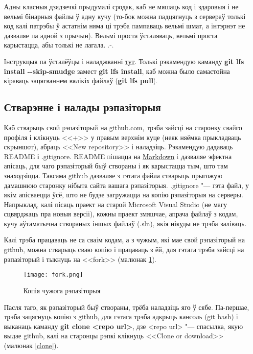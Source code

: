 \documentclass[12pt, a4paper]{extarticle}
\begin{document}
Адны класныя дзядзечкі прыдумалі сродак, каб не мяшаць код і здаровыя і не вельмі бінарныя файлы ў адну кучу (то-бок можна падцягнуць з сервераў толькі код калі патрэбы ў астатнім няма ці трэба пампаваць вельмі шмат, а інтэрнэт не дазваляе па адной з прычын). Вельмі проста ўсталяваць, вельмі проста карыстацца, абы толькі не лагала. .-.

Інструкцыя па ўсталёўцы і наладжванні \href{https://github.com/git-lfs/git-lfs}{тут}. Толькі рэкамендую каманду \textbf{git lfs install -\hspace{1pt}-skip-smudge} замест \textbf{git lfs install}, каб можна было самастойна кіраваць зацягваннем вялікіх файлаў (\textbf{git lfs pull}). 

\subsection{Стварэнне і налады рэпазіторыя}

Каб стварыць свой рэпазіторый на github.com, трэба зайсці на старонку свайго профіля і клікнуць <<+>> у правым верхнім куце (неяк няёмка прыкладваць скрыншот), абраць <<New repository>> і наладзіць. Рэкамендую дадаваць README і .gitignore. README пішацца на \href{https://en.wikipedia.org/wiki/Markdown}{Markdown} і дазваляе эфектна апісаць, для чаго рэпазіторый быў створаны і як карыстацца тым, што там знаходзіцца. Таксама github дазваляе з гэтага файла стварыць прыгожую дамашнюю старонку нібыта сайта вашага рэпазіторыя. .gitignore "--- гэта файл, у якім апісваецца ўсё, што не будзе загружацца на копію рэпазіторыя на серверы. Напрыклад, калі пісаць праект на старой Microsoft Visual Studio (не магу сцвярджаць пра новыя версіі), кожны праект змяшчае, апрача файлаў з кодам, кучу аўтаматычна створаных іншых файлаў (.sln), якія нікуды не трэба заліваць. 

Калі трэба працаваць не са сваім кодам, а з чужым, які мае свой рэпазіторый на github, можна стварыць сваю копію і працаваць з ёй, для гэтага трэба зайсці на рэпазіторый і тыкнуць на <<fork>> (малюнак \ref{fork}).

\begin{figure}[H]

\begin{center}
\texttt{[image: fork.png]}
\end{center}

\caption{Копія чужога рэпазіторыя} \label{fork}
\end{figure}

Пасля таго, як рэпазіторый быў створаны, трёба наладзіць яго ў сябе. Па-першае, трэба зацягнуць копію з github, для гэтага трэба адкрыць кансоль (git bash) і выканаць каманду \textbf{git clone <repo url>}, дзе <repo url> "--- спасылка, якую выдае github, калі на старонцы рэпкі клікнуць <<Clone or download>> (малюнак \ref{clone}).
\end{document}
